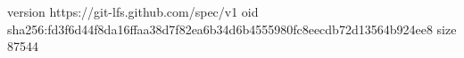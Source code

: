 version https://git-lfs.github.com/spec/v1
oid sha256:fd3f6d44f8da16ffaa38d7f82ea6b34d6b4555980fc8eecdb72d13564b924ee8
size 87544
